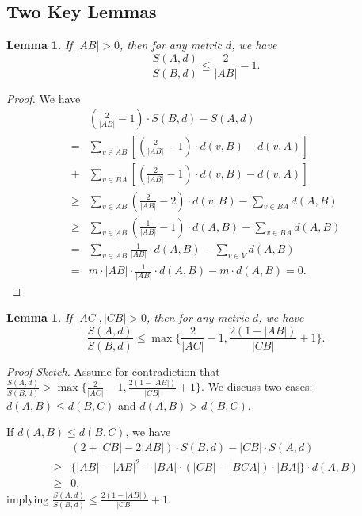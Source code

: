 \documentclass[11pt]{article}
\newtheorem{lemma}[theorem]{Lemma}
\theoremstyle{remark}
\begin{document}
\subsection{Two Key Lemmas}

\begin{lemma}\label{lem:31}
 If $|AB|>0$, then for any metric $d$, we have
  $$\frac{S(A,d)}{S(B,d)} \le \frac{2}{|AB|}-1.$$
 \end{lemma}

\begin{proof}
 We have
 \begin{align*}
 &(\frac{2}{|AB|}-1)\cdot S(B,d) - S(A,d) \\
 = & \sum_{v\in AB}{[(\frac{2}{|AB|}-1)\cdot d(v,B) - d(v,A)]}\\
 + & \sum_{v\in BA}{[(\frac{2}{|AB|}-1)\cdot d(v,B) - d(v,A)]} \\
 \ge & \sum_{v\in AB}{(\frac{2}{|AB|}-2)\cdot d(v,B)} - \sum_{v\in BA}d(A,B) \\
 \ge & \sum_{v\in AB}{(\frac{1}{|AB|}-1)\cdot d(A,B)} - \sum_{v\in BA}d(A,B) \\
  = & \sum_{v\in AB}{\frac{1}{|AB|}\cdot d(A,B)} - \sum_{v\in V}d(A,B) \\
 = & m\cdot|AB|\cdot \frac{1}{|AB|}\cdot d(A,B) - m\cdot d(A,B) = 0.
\end{align*}
\end{proof}

\begin{lemma}\label{lem:32}
 If $|AC|, |CB| > 0 $, then for any metric $d$, we have
$$ \frac{S(A,d)}{S(B,d)} \le \max\{\frac{2}{|AC|}-1 , \frac{2(1-|AB|)}{|CB|} + 1\}. $$
\end{lemma}

\emph{Proof Sketch.}
Assume for contradiction that $\frac{S(A,d)}{S(B,d)}>\max\{\frac{2}{|AC|}-1,\frac{2(1-|AB|)}{|CB|} + 1\}$. We discuss two cases: $d(A,B)\le d(B,C)$ and $d(A,B)>d(B,C)$.

If $d(A,B)\le d(B,C)$, we have
\begin{align*}
& (2+|CB|-2|AB|)\cdot S(B,d)-|CB|\cdot S(A,d)\\
\ge & \{ |AB|-|AB|^2-|BA|\cdot (|CB|-|BCA|)\cdot |BA| \} \cdot d(A,B)\\
\ge & 0,
\end{align*}
implying $\frac{S(A,d)}{S(B,d)}\le \frac{2(1-|AB|)}{|CB|} + 1$.
\end{document}
